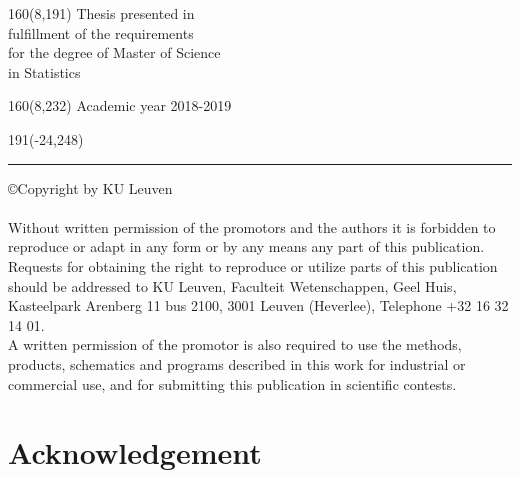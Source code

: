 \documentclass[12pt,a4paper,oneside]{book}
\newenvironment{bottompar}{\par\vspace*{\fill}}{\clearpage}
\begin{document}
%
\begin{textblock}{160}(8,191)
\textblockcolour{}
\vspace{-\parskip}
\flushright
Thesis presented in\\[4.5pt]
fulfillment of the requirements\\[4.5pt]
for the degree of Master of Science\\[4.5pt]
in Statistics\\
\end{textblock}
%
\begin{textblock}{160}(8,232)
\textblockcolour{}
\vspace{-\parskip}
\flushright
Academic year 2018-2019
\end{textblock}
%
\begin{textblock}{191}(-24,248)
{\color{blueline}\rule{550pt}{5.5pt}}
\end{textblock}
%
\vfill
\newpage

\rmfamily
\pagestyle{plain}


\newpage
\setcounter{page}{0}

\begin{bottompar}
\copyright Copyright by KU Leuven \\ \\
Without written permission of the promotors and the authors it is forbidden to reproduce or adapt in any form or by any means any part of this publication. Requests for obtaining the right to reproduce or utilize parts of this publication should be addressed to KU Leuven, Faculteit Wetenschappen, Geel Huis, Kasteelpark Arenberg 11 bus 2100, 3001 Leuven (Heverlee), Telephone +32 16 32 14 01. \\
A written permission of the promotor is also required to use the methods, products, schematics and programs described in this work for industrial or commercial use, and for submitting this publication in scientific contests.
\end{bottompar}



\chapter*{Acknowledgement}
\end{document}
